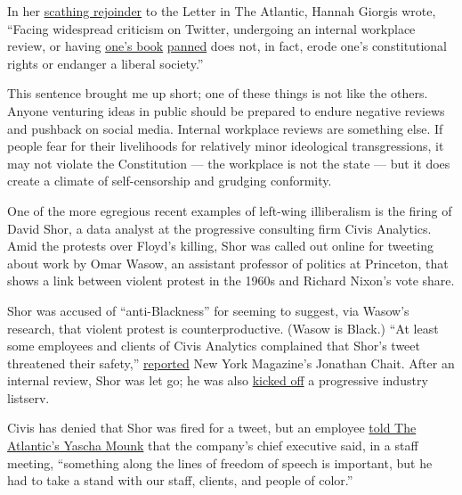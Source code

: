 In her
\href{https://www.theatlantic.com/culture/archive/2020/07/harpers-letter-free-speech/614080/}{scathing
rejoinder} to the Letter in The Atlantic, Hannah Giorgis wrote, ``Facing
widespread criticism on Twitter, undergoing an internal workplace
review, or having
\href{https://www.theatlantic.com/ideas/archive/2020/01/american-dirt-controversy/605725/?gclid=EAIaIQobChMIo5rIn5fI6gIVDorICh1e2wb8EAAYASAAEgJl1_D_BwE}{one's
book}
\href{https://www.bookforum.com/print/2603/thomas-chatterton-williams-s-confused-argument-for-a-post-racial-society-23610}{panned}
does not, in fact, erode one's constitutional rights or endanger a
liberal society.''

This sentence brought me up short; one of these things is not like the
others. Anyone venturing ideas in public should be prepared to endure
negative reviews and pushback on social media. Internal workplace
reviews are something else. If people fear for their livelihoods for
relatively minor ideological transgressions, it may not violate the
Constitution --- the workplace is not the state --- but it does create a
climate of self-censorship and grudging conformity.

One of the more egregious recent examples of left-wing illiberalism is
the firing of David Shor, a data analyst at the progressive consulting
firm Civis Analytics. Amid the protests over Floyd's killing, Shor was
called out online for tweeting about work by Omar Wasow, an assistant
professor of politics at Princeton, that shows a link between violent
protest in the 1960s and Richard Nixon's vote share.

Shor was accused of ``anti-Blackness'' for seeming to suggest, via
Wasow's research, that violent protest is counterproductive. (Wasow is
Black.) ``At least some employees and clients of Civis Analytics
complained that Shor's tweet threatened their safety,''
\href{https://nymag.com/intelligencer/2020/06/case-for-liberalism-tom-cotton-new-york-times-james-bennet.html}{reported}
New York Magazine's Jonathan Chait. After an internal review, Shor was
let go; he was also
\href{https://nymag.com/intelligencer/2020/06/white-fragility-racism-racism-progressive-progressphiles-david-shor.html}{kicked
off} a progressive industry listserv.

Civis has denied that Shor was fired for a tweet, but an employee
\href{https://www.theatlantic.com/ideas/archive/2020/06/stop-firing-innocent/613615/}{told
The Atlantic's Yascha Mounk} that the company's chief executive said, in
a staff meeting, ``something along the lines of freedom of speech is
important, but he had to take a stand with our staff, clients, and
people of color.''

